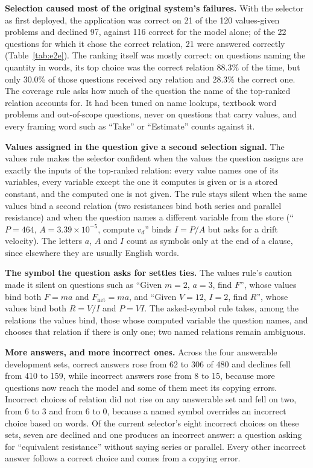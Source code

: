 \documentclass[10pt]{article}
\begin{document}
\textbf{Selection caused most of the original system's failures.} With the selector as first deployed,
the application was correct on 21 of the 120 values-given problems and declined 97, against 116 correct
for the model alone; of the 22 questions for which it chose the correct relation, 21 were answered
correctly (Table~\ref{tab:e2e}). The ranking itself was mostly correct: on questions naming the quantity
in words, its top choice was the correct relation 88.3\% of the time, but only 30.0\% of those questions
received any relation and 28.3\% the correct one. The coverage rule asks how much of the question the name
of the top-ranked relation accounts for. It had been tuned on name lookups, textbook word problems and
out-of-scope questions, never on questions that carry values, and every framing word such as ``Take''
or ``Estimate'' counts against it.

\textbf{Values assigned in the question give a second selection signal.} The values rule makes the
selector confident when the values the question assigns are exactly the inputs of the top-ranked
relation: every value names one of its variables, every variable except the one it computes is
given or is a stored constant, and the computed one is not given. The rule stays silent when the same
values bind a second relation (two resistances bind both series and parallel resistance) and when the
question names a different variable from the store (``$P = 464$, $A = 3.39\times10^{-5}$, compute
$v_d$'' binds $I = P/A$ but asks for a drift velocity). The letters $a$, $A$ and $I$ count as symbols
only at the end of a clause, since elsewhere they are usually English words.

\textbf{The symbol the question asks for settles ties.} The values rule's caution made it silent on
questions such as ``Given $m = 2$, $a = 3$, find $F$'', whose values bind both $F = ma$ and
$F_\mathrm{net} = ma$, and ``Given $V = 12$, $I = 2$, find $R$'', whose values bind both $R = V/I$ and
$P = VI$. The asked-symbol rule takes, among the relations the values bind, those whose computed variable
the question names, and chooses that relation if there is only one; two named relations remain ambiguous.

\textbf{More answers, and more incorrect ones.} Across the four answerable development sets, correct
answers rose from 62 to 306 of 480 and declines fell from 410 to 159, while incorrect answers rose from 8
to 15, because more questions now reach the model and some of them meet its copying errors. Incorrect
choices of relation did not rise on any answerable set and fell on two, from 6 to 3 and from 6 to 0,
because a named symbol overrides an incorrect choice based on words. Of the current selector's eight incorrect
choices on these sets, seven are declined and one produces an incorrect answer: a question asking for
``equivalent resistance'' without saying series or parallel. Every other incorrect answer follows a correct
choice and comes from a copying error.
\end{document}
